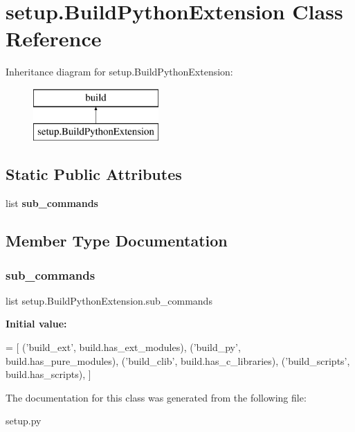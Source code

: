 \hypertarget{classsetup_1_1_build_python_extension}{}\section{setup.\+Build\+Python\+Extension Class Reference}
\label{classsetup_1_1_build_python_extension}
Inheritance diagram for setup.\+Build\+Python\+Extension\+:\begin{figure}[H]
\begin{center}
\leavevmode
\includegraphics[height=2.000000cm]{classsetup_1_1_build_python_extension}
\end{center}
\end{figure}
\subsection*{Static Public Attributes}
\begin{DoxyCompactItemize}
\item 
list {\bfseries sub\+\_\+commands}
\end{DoxyCompactItemize}


\subsection{Member Type Documentation}
\mbox{\label{classsetup_1_1_build_python_extension_a3a73172f145fd2e3463c62892384a37b}} 
\subsubsection{\texorpdfstring{sub\+\_\+commands}{sub\_commands}}
{\footnotesize\ttfamily list setup.\+Build\+Python\+Extension.\+sub\+\_\+commands\hspace{0.3cm}{\ttfamily [static]}}

{\bfseries Initial value\+:}
\begin{DoxyCode}
=  [
        (\textcolor{stringliteral}{'build\_ext'}, build.has\_ext\_modules),
        (\textcolor{stringliteral}{'build\_py'}, build.has\_pure\_modules),
        (\textcolor{stringliteral}{'build\_clib'}, build.has\_c\_libraries),
        (\textcolor{stringliteral}{'build\_scripts'}, build.has\_scripts),
    ]
\end{DoxyCode}


The documentation for this class was generated from the following file\+:\begin{DoxyCompactItemize}
\item 
setup.\+py\end{DoxyCompactItemize}
